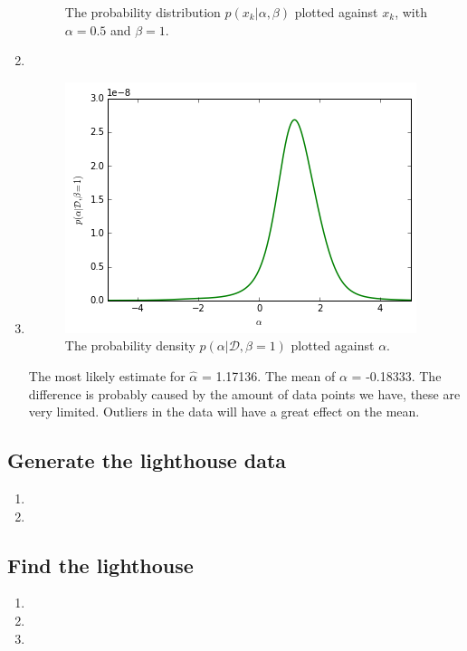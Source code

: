 \documentclass[a4paper,10pt]{article}
\numberwithin{equation}{section} %
\numberwithin{figure}{section} %
\numberwithin{table}{section} %
\theoremstyle{mytheor}
\begin{document}
\begin{enumerate}
\begin{figure}[h!]
   			\caption{\vspace{-0.2cm} The probability distribution $p(x_k | \alpha, \beta)$ plotted against $x_k$, with $\alpha = 0.5$ and $\beta = 1$.}
  		\end{figure}	
	\item 
	\item \begin{figure}[h!]
   			\centering
   			\includegraphics{alpharoni.png}\vspace{-0.2cm}
   			\caption{\vspace{-0.2cm} The probability density $p(\alpha | \mathcal{D}, \beta = 1)$ plotted against $\alpha$.}
  		\end{figure}
  		The most likely estimate for $\hat{\alpha}$ = 1.17136. The mean of $\alpha$ = -0.18333. The difference is probably caused by the amount of data points we have, these are very limited. Outliers in the data will have a great effect on the mean.
\end{enumerate}

\subsection{Generate the lighthouse data}
\begin{enumerate}
	\item
	\item 
\end{enumerate}

\subsection{Find the lighthouse}
\begin{enumerate}
	\item
	\item 
	\item 
\end{enumerate}
\end{document}
